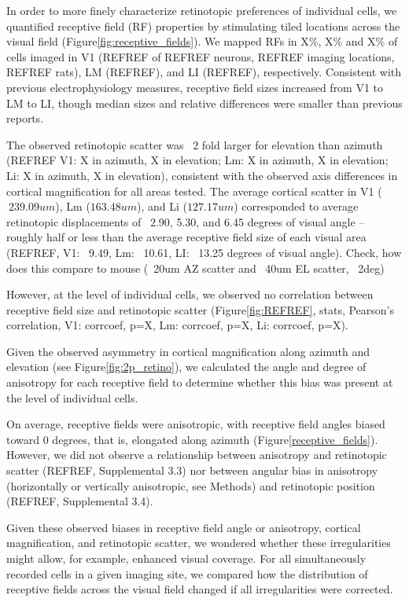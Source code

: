 In order to more finely characterize retinotopic preferences of individual cells, we quantified receptive field (RF) properties by stimulating tiled locations across the visual field (Figure\ref{fig:receptive_fields}). We mapped RFs in X\%, X\% and X\% of cells imaged in V1 (REFREF of REFREF neurons, REFREF imaging locations, REFREF rats), LM (REFREF), and LI (REFREF), respectively. Consistent with previous electrophysiology measures\cite{Vermaercke2014, Tafazoli2017}, receptive field sizes increased from V1 to LM to LI, though median sizes and relative differences were smaller than previous reports. 


The observed retinotopic scatter was ~2 fold larger for elevation than azimuth (REFREF V1: X in azimuth, X in elevation; Lm: X in azimuth, X in elevation; Li: X in azimuth, X in elevation), consistent with the observed axis differences in cortical magnification for all areas tested. The average cortical scatter in V1 ($~239.09um$), Lm ($163.48 um$), and Li ($127.17 um$) corresponded to average retinotopic displacements of  ~2.90, 5.30, and 6.45 degrees of visual angle -- roughly half or less than the average receptive field size of each visual area (REFREF, V1: ~9.49, Lm: ~10.61, LI: ~13.25 degrees of visual angle). Check, how does this compare to mouse (~20um AZ scatter and ~40um EL scatter, ~2deg)

However, at the level of individual cells, we observed no correlation between receptive field size and retinotopic scatter (Figure\ref{fig:REFREF}, stats, Pearson’s correlation, V1: corrcoef, p=X, Lm: corrcoef, p=X, Li: corrcoef, p=X).

Given the observed asymmetry in cortical magnification along azimuth and elevation (see Figure\ref{fig:2p_retino}), we calculated the angle and degree of anisotropy for each receptive field to determine whether this bias was present at the level of individual cells.

On average, receptive fields were anisotropic, with receptive field angles biased toward 0 degrees, that is, elongated along azimuth (Figure\ref{receptive_fields}). However, we did not observe a relationship between anisotropy and retinotopic scatter (REFREF, Supplemental 3.3) nor between angular bias in anisotropy (horizontally or vertically anisotropic, see Methods) and retinotopic position (REFREF, Supplemental 3.4).

Given these observed biases in receptive field angle or anisotropy, cortical magnification, and retinotopic scatter, we wondered whether these irregularities might allow, for example, enhanced visual coverage. For all simultaneously recorded cells in a given imaging site, we compared how the distribution of receptive fields across the visual field changed if all irregularities were corrected. 

